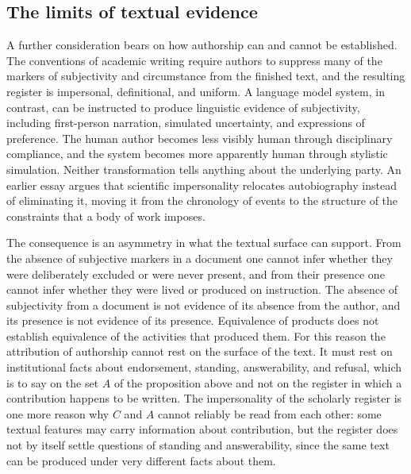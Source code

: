 \documentclass[12pt]{article}
\theoremstyle{definition}
\theoremstyle{plain}
\begin{document}
\subsection{The limits of textual evidence}

A further consideration bears on how authorship can and cannot be established. The conventions of academic writing require authors to suppress many of the markers of subjectivity and circumstance from the finished text, and the resulting register is impersonal, definitional, and uniform. A language model system, in contrast, can be instructed to produce linguistic evidence of subjectivity, including first-person narration, simulated uncertainty, and expressions of preference. The human author becomes less visibly human through disciplinary compliance, and the system becomes more apparently human through stylistic simulation. Neither transformation tells anything about the underlying party. An earlier essay \cite{flyxion-erasure} argues that scientific impersonality relocates autobiography instead of eliminating it, moving it from the chronology of events to the structure of the constraints that a body of work imposes.

The consequence is an asymmetry in what the textual surface can support. From the absence of subjective markers in a document one cannot infer whether they were deliberately excluded or were never present, and from their presence one cannot infer whether they were lived or produced on instruction. The absence of subjectivity from a document is not evidence of its absence from the author, and its presence is not evidence of its presence. Equivalence of products does not establish equivalence of the activities that produced them. For this reason the attribution of authorship cannot rest on the surface of the text. It must rest on institutional facts about endorsement, standing, answerability, and refusal, which is to say on the set $A$ of the proposition above and not on the register in which a contribution happens to be written. The impersonality of the scholarly register is one more reason why $C$ and $A$ cannot reliably be read from each other: some textual features may carry information about contribution, but the register does not by itself settle questions of standing and answerability, since the same text can be produced under very different facts about them.
\end{document}
